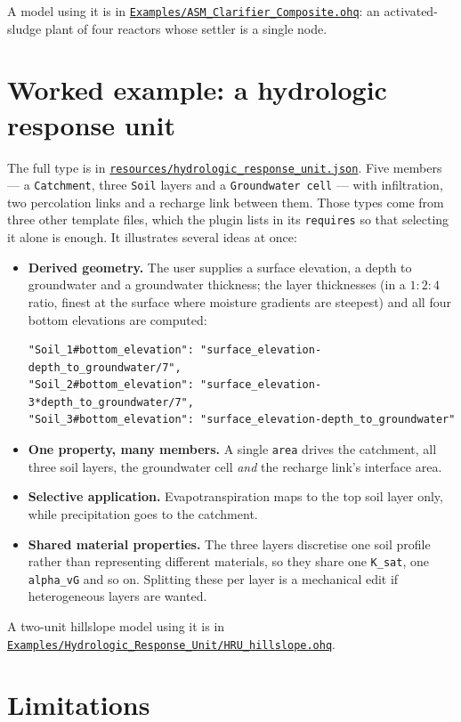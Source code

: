 \documentclass[11pt,a4paper]{article}
\newcommand{\code}[1]{\texttt{\small #1}}
\newcommand{\file}[1]{\texttt{\small #1}}
\newcommand{\ghbase}{https://github.com/ArashMassoudieh/OpenHydroQual/blob/master}
\newcommand{\exfile}[1]{\href{\ghbase/#1}{\file{#1}}}
\begin{document}
A model using it is in \exfile{Examples/ASM\_Clarifier\_Composite.ohq}: an
activated-sludge plant of four reactors whose settler is a single node.

\section{Worked example: a hydrologic response unit}

The full type is in \exfile{resources/hydrologic\_response\_unit.json}. Five
members --- a \code{Catchment}, three \code{Soil} layers and a
\code{Groundwater cell} --- with infiltration, two percolation links and a
recharge link between them. Those types come from three other template files,
which the plugin lists in its \code{requires} so that selecting it alone is
enough. It illustrates several ideas at once:

\begin{itemize}[leftmargin=1.4em]
\item \textbf{Derived geometry.} The user supplies a surface elevation, a depth
to groundwater and a groundwater thickness; the layer thicknesses (in a
$1\!:\!2\!:\!4$ ratio, finest at the surface where moisture gradients are
steepest) and all four bottom elevations are computed:
\begin{lstlisting}
"Soil_1#bottom_elevation": "surface_elevation-depth_to_groundwater/7",
"Soil_2#bottom_elevation": "surface_elevation-3*depth_to_groundwater/7",
"Soil_3#bottom_elevation": "surface_elevation-depth_to_groundwater"
\end{lstlisting}
\item \textbf{One property, many members.} A single \code{area} drives the
catchment, all three soil layers, the groundwater cell \emph{and} the recharge
link's interface area.
\item \textbf{Selective application.} Evapotranspiration maps to the top soil
layer only, while precipitation goes to the catchment.
\item \textbf{Shared material properties.} The three layers discretise one soil
profile rather than representing different materials, so they share one
\code{K\_sat}, one \code{alpha\_vG} and so on. Splitting these per layer is a
mechanical edit if heterogeneous layers are wanted.
\end{itemize}

\noindent
A two-unit hillslope model using it is in
\exfile{Examples/Hydrologic\_Response\_Unit/HRU\_hillslope.ohq}.

\section{Limitations}
\end{document}
